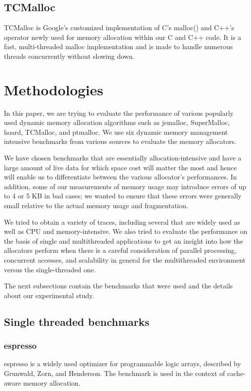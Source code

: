 \documentclass[sigplan,screen]{acmart}
\begin{document}
\subsection{TCMalloc}
TCMalloc is Google's customized implementation of C's malloc() and C++'s operator newly used for memory allocation within our C and C++ code. It is a fast, multi-threaded malloc implementation and is made to handle numerous threads concurrently without slowing down.


\section{Methodologies}
In this paper, we are trying to evaluate the performance of various popularly used dynamic memory allocation algorithms such as jemalloc, SuperMalloc, hoard, TCMalloc, and ptmalloc. We use six dynamic memory management intensive benchmarks from various sources to evaluate the memory allocators. 

We have chosen benchmarks that are essentially allocation-intensive and have a large amount of live data for which space cost will matter the most and hence will enable us to differentiate between the various allocator’s performances. In addition, some of our measurements of memory usage may introduce errors of up to 4 or 5 KB in bad cases; we wanted to ensure that these errors were generally small relative to the actual memory usage and fragmentation. 

We tried to obtain a variety of traces, including several that are widely used as well as CPU and memory-intensive\cite{johnstone1998memory}. We also tried to evaluate the performance on the basis of single and multithreaded applications to get an insight into how the allocators perform when there is a careful consideration of parallel processing, concurrent accesses, and scalability in general for the multithreaded environment versus the single-threaded one. 

The next subsections contain the benchmarks that were used and the details about our experimental study.

\subsection{Single threaded benchmarks}

\subsubsection{espresso}
espresso is a widely used optimizer for programmable logic arrays, described by Grunwald, Zorn, and Henderson\cite{grunwald1993improving}. The benchmark is used in the context of cache-aware memory allocation.
\end{document}

